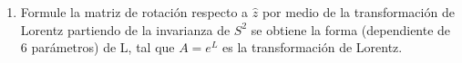 \documentclass[12pt,letterpaper]{report}
\begin{document}
\begin{enumerate}
\begin{align*}
\begin{matrix}
        -E_x &  0  & -B_z & B_y \\
        -E_y & B_z & 0 &-B_x \\
        -E_z & -B_y & B_x & 0  
    \end{matrix}\right)
\end{align*}
por lo tanto:
\begin{equation*}
    F_{\alpha \beta} = \left( \begin{matrix}
        0 & Ex & Ey   & Ez \\
        -E_x &  0  & -B_z & B_y \\
        -E_y & B_z & 0 &-B_x \\
        -E_z & -B_y & B_x & 0  
    \end{matrix}\right)
\end{equation*}
\item Formule la matriz de rotación respecto a $\hat{z}$ por medio de la transformación de Lorentz partiendo de la invarianza de $S^2$ se obtiene la 
forma (dependiente de 6 parámetros) de L, tal que $A=e^L$ es la transformación de Lorentz.
\end{enumerate}
\end{document}
